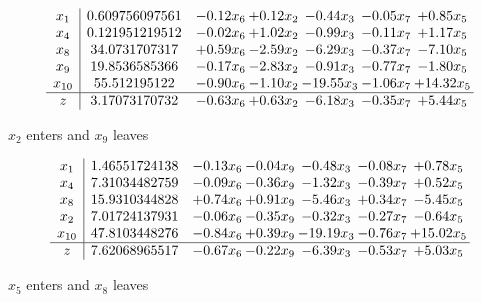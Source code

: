 \documentclass[8pt]{article}
\begin{document}
 \[\begin{array}{c| c c@{\hskip 2pt} c@{\hskip 2pt} c@{\hskip 2pt} c@{\hskip 2pt} c@{\hskip 2pt} }
 x_{1}   &  0.609756097561 & -0.12 x_{6} & +  0.12 x_{2} & -0.44 x_{3} & -0.05 x_{7} & +  0.85 x_{5}\\
 x_{4}   &  0.121951219512 & -0.02 x_{6} & +  1.02 x_{2} & -0.99 x_{3} & -0.11 x_{7} & +  1.17 x_{5}\\
 x_{8}   &  34.0731707317 & +  0.59 x_{6} & -2.59 x_{2} & -6.29 x_{3} & -0.37 x_{7} & -7.10 x_{5}\\
 x_{9}   &  19.8536585366 & -0.17 x_{6} & -2.83 x_{2} & -0.91 x_{3} & -0.77 x_{7} & -1.80 x_{5}\\
 x_{10}   &  55.512195122 & -0.90 x_{6} & -1.10 x_{2} & -19.55 x_{3} & -1.06 x_{7} & + 14.32 x_{5}\\
\hline
z    &  3.17073170732 & -0.63 x_{6} & +  0.63 x_{2} & -6.18 x_{3} & -0.35 x_{7} & +  5.44 x_{5}\\
\end{array}\]


 $ x_{2} $ enters and $ x_{9} $ leaves 

 \[\begin{array}{c| c c@{\hskip 2pt} c@{\hskip 2pt} c@{\hskip 2pt} c@{\hskip 2pt} c@{\hskip 2pt} }
 x_{1}   &  1.46551724138 & -0.13 x_{6} & -0.04 x_{9} & -0.48 x_{3} & -0.08 x_{7} & +  0.78 x_{5}\\
 x_{4}   &  7.31034482759 & -0.09 x_{6} & -0.36 x_{9} & -1.32 x_{3} & -0.39 x_{7} & +  0.52 x_{5}\\
 x_{8}   &  15.9310344828 & +  0.74 x_{6} & +  0.91 x_{9} & -5.46 x_{3} & +  0.34 x_{7} & -5.45 x_{5}\\
 x_{2}   &  7.01724137931 & -0.06 x_{6} & -0.35 x_{9} & -0.32 x_{3} & -0.27 x_{7} & -0.64 x_{5}\\
 x_{10}   &  47.8103448276 & -0.84 x_{6} & +  0.39 x_{9} & -19.19 x_{3} & -0.76 x_{7} & + 15.02 x_{5}\\
\hline
z    &  7.62068965517 & -0.67 x_{6} & -0.22 x_{9} & -6.39 x_{3} & -0.53 x_{7} & +  5.03 x_{5}\\
\end{array}\]


 $ x_{5} $ enters and $ x_{8} $ leaves 
\end{document}
